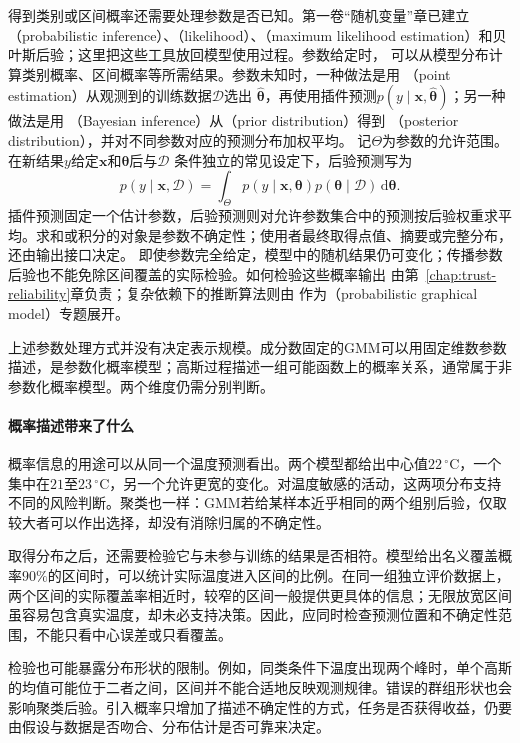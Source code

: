 得到类别或区间概率还需要处理参数是否已知。第一卷“随机变量”章已建立（probabilistic inference）、（likelihood）、（maximum likelihood estimation）和贝叶斯后验；这里把这些工具放回模型使用过程。参数给定时，
可以从模型分布计算类别概率、区间概率等所需结果。参数未知时，一种做法是用
（point estimation）从观测到的训练数据$\mathcal D$选出
$\hat{\bm{\theta}}$，再使用插件预测$p(y\mid\bm x,\hat{\bm{\theta}})$；另一种做法是用
（Bayesian inference）从（prior distribution）得到
（posterior distribution），并对不同参数对应的预测分布加权平均。
记$\Theta$为参数的允许范围。在新结果$y$给定$\bm x$和$\bm\theta$后与$\mathcal D$
条件独立的常见设定下，后验预测写为
\[
  p(y\mid\bm x,\mathcal D)
  =\int_{\Theta} p(y\mid\bm x,\bm\theta)
    p(\bm\theta\mid\mathcal D)\,\mathrm d\bm\theta.
\]
插件预测固定一个估计参数，后验预测则对允许参数集合中的预测按后验权重求平均。求和或积分的对象是参数不确定性；使用者最终取得点值、摘要或完整分布，还由输出接口决定。
即使参数完全给定，模型中的随机结果仍可变化；传播参数后验也不能免除区间覆盖的实际检验。如何检验这些概率输出
由第~\ref{chap:trust-reliability}章负责；复杂依赖下的推断算法则由
作为（probabilistic graphical model）专题展开。

上述参数处理方式并没有决定表示规模。成分数固定的GMM可以用固定维数参数描述，是参数化概率模型；高斯过程描述一组可能函数上的概率关系，通常属于非参数化概率模型。两个维度仍需分别判断。

\paragraph{概率描述带来了什么}

概率信息的用途可以从同一个温度预测看出。两个模型都给出中心值$22\,^{\circ}\mathrm{C}$，一个集中在$21$至$23\,^{\circ}\mathrm{C}$，另一个允许更宽的变化。对温度敏感的活动，这两项分布支持不同的风险判断。聚类也一样：GMM若给某样本近乎相同的两个组别后验，仅取较大者可以作出选择，却没有消除归属的不确定性。

取得分布之后，还需要检验它与未参与训练的结果是否相符。模型给出名义覆盖概率$90\%$的区间时，可以统计实际温度进入区间的比例。在同一组独立评价数据上，两个区间的实际覆盖率相近时，较窄的区间一般提供更具体的信息；无限放宽区间虽容易包含真实温度，却未必支持决策。因此，应同时检查预测位置和不确定性范围，不能只看中心误差或只看覆盖。

检验也可能暴露分布形状的限制。例如，同类条件下温度出现两个峰时，单个高斯的均值可能位于二者之间，区间并不能合适地反映观测规律。错误的群组形状也会影响聚类后验。引入概率只增加了描述不确定性的方式，任务是否获得收益，仍要由假设与数据是否吻合、分布估计是否可靠来决定。

